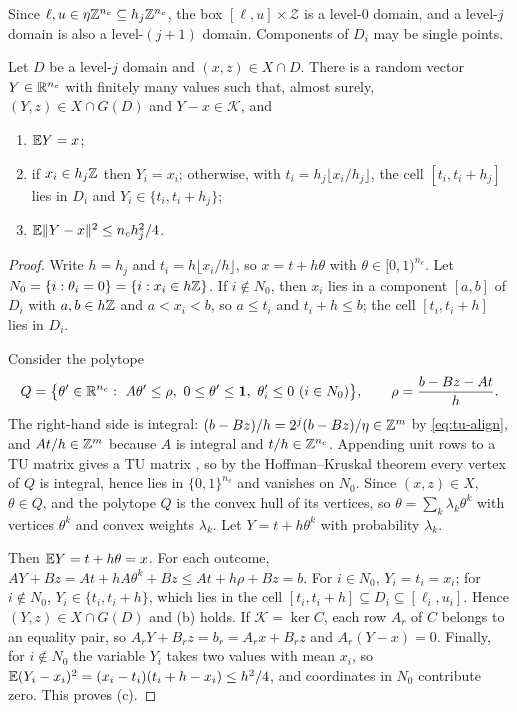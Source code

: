 Since $\ell,u\in\eta\mathbb Z^{n_c}\subseteq h_j\mathbb Z^{n_c}$, the box
$[\ell,u]\times\mathcal Z$ is a level-$0$ domain, and a level-$j$ domain is
also a level-$(j+1)$ domain. Components of $D_i$ may be single points.

\begin{lemma}\label{lem:tu-round}
Let $D$ be a level-$j$ domain and $(x,z)\in X\cap D$. There is a random vector
$Y\in\mathbb R^{n_c}$ with finitely many values such that, almost surely,
$(Y,z)\in X\cap G(D)$ and $Y-x\in\mathcal K$, and
\begin{enumerate}[label=(\alph*)]
\item $\mathbb E Y=x$;
\item if $x_i\in h_j\mathbb Z$ then $Y_i=x_i$; otherwise, with
$t_i=h_j\lfloor x_i/h_j\rfloor$, the cell $[t_i,t_i+h_j]$ lies in $D_i$ and
$Y_i\in\{t_i,t_i+h_j\}$;
\item $\mathbb E\lVert Y-x\rVert^2\le n_ch_j^2/4$.
\end{enumerate}
\end{lemma}

\begin{proof}
Write $h=h_j$ and $t_i=h\lfloor x_i/h\rfloor$, so $x=t+h\theta$ with
$\theta\in[0,1)^{n_c}$. Let $N_0=\{i:\theta_i=0\}=\{i:x_i\in h\mathbb Z\}$. If
$i\notin N_0$, then $x_i$ lies in a component $[a,b]$ of $D_i$ with
$a,b\in h\mathbb Z$ and $a<x_i<b$, so $a\le t_i$ and $t_i+h\le b$; the cell
$[t_i,t_i+h]$ lies in $D_i$.

Consider the polytope
\[
Q=\bigl\{\theta'\in\R^{n_c}:\ A\theta'\le\rho,\ 0\le\theta'\le\mathbf 1,\
\theta'_i\le0\ (i\in N_0)\bigr\},\qquad \rho=\frac{b-Bz-At}{h}.
\]
The right-hand side is integral: $(b-Bz)/h=2^j(b-Bz)/\eta\in\mathbb Z^m$ by
\eqref{eq:tu-align}, and $At/h\in\mathbb Z^m$ because $A$ is integral and
$t/h\in\mathbb Z^{n_c}$. Appending unit rows to a TU matrix gives a TU matrix
\cite[Section~19.1]{Schrijver1986}, so by the Hoffman--Kruskal theorem
\cite{HoffmanKruskal1956} every vertex of $Q$ is integral, hence lies in
$\{0,1\}^{n_c}$ and vanishes on $N_0$. Since $(x,z)\in X$, $\theta\in Q$, and the
polytope $Q$ is the convex hull of its vertices, so
$\theta=\sum_k\lambda_k\theta^k$ with vertices $\theta^k$ and convex weights
$\lambda_k$. Let $Y=t+h\theta^k$ with probability $\lambda_k$.

Then $\mathbb E Y=t+h\theta=x$. For each outcome,
$AY+Bz=At+hA\theta^k+Bz\le At+h\rho+Bz=b$. For $i\in N_0$, $Y_i=t_i=x_i$; for
$i\notin N_0$, $Y_i\in\{t_i,t_i+h\}$, which lies in the cell
$[t_i,t_i+h]\subseteq D_i\subseteq[\ell_i,u_i]$. Hence $(Y,z)\in X\cap G(D)$
and (b) holds. If $\mathcal K=\ker C$, each row $A_r$ of $C$ belongs to an
equality pair, so $A_rY+B_rz=b_r=A_rx+B_rz$ and $A_r(Y-x)=0$. Finally, for
$i\notin N_0$ the variable $Y_i$ takes two values with mean $x_i$, so
$\mathbb E(Y_i-x_i)^2=(x_i-t_i)(t_i+h-x_i)\le h^2/4$, and coordinates in $N_0$
contribute zero. This proves (c).
\end{proof}

